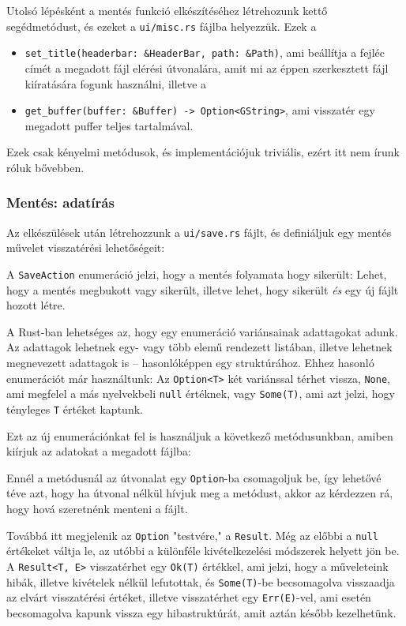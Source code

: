 Utolsó lépésként a mentés funkció elkészítéséhez létrehozunk kettő segédmetódust,
és ezeket a \texttt{ui/misc.rs} fájlba helyezzük.
Ezek a 
\begin{itemize}
    \item \verb+set_title(headerbar: &HeaderBar, path: &Path)+,
    ami beállítja a fejléc címét a megadott fájl elérési útvonalára,
    amit mi az éppen szerkesztett fájl kiíratására fogunk használni, illetve a
    \item \verb+get_buffer(buffer: &Buffer) -> Option<GString>+,
    ami visszatér egy megadott puffer teljes tartalmával.
\end{itemize}
Ezek csak kényelmi metódusok, és implementációjuk triviális, ezért itt nem írunk róluk bővebben.

\subsubsection{Mentés: adatírás}

Az elkészülések után létrehozzunk a \texttt{ui/save.rs} fájlt,
és definiáljuk egy mentés művelet visszatérési lehetőségeit:



A \texttt{SaveAction} enumeráció jelzi, hogy a mentés folyamata hogy sikerült:
Lehet, hogy a mentés megbukott vagy sikerült, illetve lehet, hogy sikerült \textit{és}
egy új fájlt hozott létre.

A Rust-ban lehetséges az, hogy egy enumeráció variánsainak adattagokat adunk.
Az adattagok lehetnek egy- vagy több elemű rendezett listában, illetve lehetnek
megnevezett adattagok is -- hasonlóképpen egy struktúrához.
Ehhez hasonló enumerációt már használtunk: Az \texttt{Option<T>} két variánssal térhet vissza,
\texttt{None}, ami megfelel a más nyelvekbeli \texttt{null} értéknek, vagy
\texttt{Some(T)}, ami azt jelzi, hogy tényleges \texttt{T} értéket kaptunk.

Ezt az új enumerációnkat fel is használjuk a következő metódusunkban, amiben
kiírjuk az adatokat a megadott fájlba:



Ennél a metódusnál az útvonalat egy \texttt{Option}-ba csomagoljuk be, így lehetővé téve
azt, hogy ha útvonal nélkül hívjuk meg a metódust, akkor az kérdezzen rá, hogy hová
szeretnénk menteni a fájlt.

Továbbá itt megjelenik az \texttt{Option} "testvére," a \texttt{Result}.
Még az előbbi a \texttt{null} értékeket váltja le, az utóbbi a különféle kivételkezelési
módszerek helyett jön be.
A \texttt{Result<T, E>} visszatérhet egy \texttt{Ok(T)} értékkel, ami jelzi,
hogy a műveleteink hibák, illetve kivételek nélkül lefutottak, és \texttt{Some(T)}-be 
becsomagolva visszaadja az elvárt visszatérési értéket,
illetve visszatérhet egy \texttt{Err(E)}-vel, ami esetén becsomagolva kapunk vissza
egy hibastruktúrát, amit aztán később kezelhetünk.


